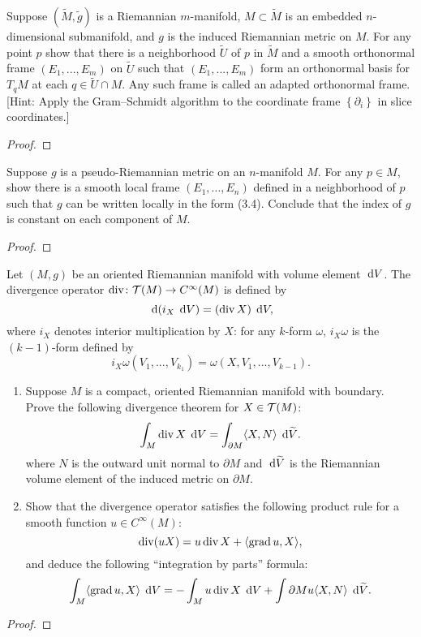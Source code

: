 \begin{problem}
Suppose $(\widetilde M,\tilde g)$ is a Riemannian $m$-manifold,
$M\subset\widetilde M$ is an embedded $n$-dimensional submanifold, and $g$
is the induced Riemannian metric on $M$. For any point $p$ show that there
is a neighborhood $\widetilde U$ of $p$ in $\widetilde M$ and a smooth
orthonormal frame $(E_1,...,E_m)$ on $\widetilde U$ such that
$(E_1,...,E_m)$ form an orthonormal basis for $T_qM$ at each
$q\in\widetilde{U}\cap M$. Any such frame is called an adapted orthonormal
frame. [Hint: Apply the Gram--Schmidt algorithm to the coordinate frame
$\left\{\partial_i\right\}$ in slice coordinates.]
\end{problem}
\begin{proof}

\end{proof}
\newpage

\begin{problem}
Suppose $g$ is a pseudo-Riemannian metric on an $n$-manifold $M$. For any
$p\in M$, show there is a smooth local frame $(E_1,...,E_n)$ defined in a
neighborhood of $p$ such that $g$ can be written locally in the form
(3.4). Conclude that the index of $g$ is constant on each component of
$M$.
\end{problem}
\begin{proof}
\end{proof}
\newpage

\begin{problem}
Let $(M,g)$ be an oriented Riemannian manifold with volume element
$\;\mathrm{d} V$. The divergence operator $\operatorname{div}\colon\mathcal{T}(M)\to C^\infty(M)$ is
defined by
\[
\;\mathrm{d}(i_X\,\;\mathrm{d} V)=(\operatorname{div} X)\,\;\mathrm{d} V,
\]
where $i_X$ denotes interior multiplication by $X$: for any $k$-form
$\omega$, $i_X\omega$ is the $(k-1)$-form defined by
\[
i_X\omega(V_1,...,V_{k_1})=\omega(X,V_1,...,V_{k-1}).
\]
\begin{enumerate}[label=(\alph*)]
\item Suppose $M$ is a compact, oriented Riemannian manifold with
  boundary. Prove the following divergence theorem for $X\in\mathcal{T}(M)$:
\[
\int_M\operatorname{div} X\,\;\mathrm{d} V=\int_{\partial M}\langle X,N \rangle\,\;\mathrm{d}\widetilde V.
\]
where $N$ is the outward unit normal to $\partial M$ and $\;\mathrm{d}\widetilde V$ is
the Riemannian volume element of the induced metric on $\partial M$.
\item Show that the divergence operator satisfies the following product
  rule for a smooth function $u\in C^\infty(M)$:
\[
\operatorname{div}(uX)=u\operatorname{div} X+\langle\operatorname{grad} u,X\rangle,
\]
and deduce the following ``integration by parts'' formula:
\[
\int_M\langle\operatorname{grad} u,X\rangle\,\;\mathrm{d} V=-\int_M u\operatorname{div} X\,\;\mathrm{d} V+\int{\partial M}
u\langle X,N\rangle\,\;\mathrm{d}\widetilde V.
\]
\end{enumerate}
\end{problem}
\begin{proof}
\end{proof}
\newpage

